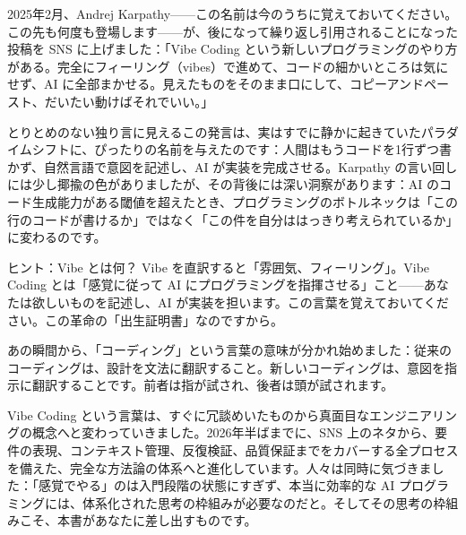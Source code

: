 


2025年2月、Andrej Karpathy——この名前は今のうちに覚えておいてください。この先も何度も登場します——が、後になって繰り返し引用されることになった投稿を SNS に上げました：「Vibe Coding という新しいプログラミングのやり方がある。完全にフィーリング（vibes）で進めて、コードの細かいところは気にせず、AI に全部まかせる。見えたものをそのまま口にして、コピーアンドペースト、だいたい動けばそれでいい。」

とりとめのない独り言に見えるこの発言は、実はすでに静かに起きていたパラダイムシフトに、ぴったりの名前を与えたのです：人間はもうコードを1行ずつ書かず、自然言語で意図を記述し、AI が実装を完成させる。Karpathy の言い回しには少し揶揄の色がありましたが、その背後には深い洞察があります：AI のコード生成能力がある閾値を超えたとき、プログラミングのボトルネックは「この行のコードが書けるか」ではなく「この件を自分ははっきり考えられているか」に変わるのです。

\begin{tcbinfo}{ヒント：Vibe とは何？}
Vibe を直訳すると「雰囲気、フィーリング」。Vibe Coding とは「感覚に従って AI にプログラミングを指揮させる」こと——あなたは欲しいものを記述し、AI が実装を担います。この言葉を覚えておいてください。この革命の「出生証明書」なのですから。

\end{tcbinfo}

あの瞬間から、「コーディング」という言葉の意味が分かれ始めました：従来のコーディングは、設計を文法に翻訳すること。新しいコーディングは、意図を指示に翻訳することです。前者は指が試され、後者は頭が試されます。

Vibe Coding という言葉は、すぐに冗談めいたものから真面目なエンジニアリングの概念へと変わっていきました。2026年半ばまでに、SNS 上のネタから、要件の表現、コンテキスト管理、反復検証、品質保証までをカバーする全プロセスを備えた、完全な方法論の体系へと進化しています。人々は同時に気づきました：「感覚でやる」のは入門段階の状態にすぎず、本当に効率的な AI プログラミングには、体系化された思考の枠組みが必要なのだと。そしてその思考の枠組みこそ、本書があなたに差し出すものです。

